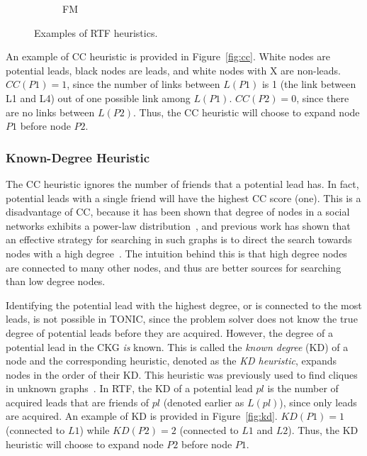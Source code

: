 \documentclass[journal]{IEEEtran}
\begin{document}
\begin{figure}
\begin{subfigure}{.19\textwidth}
   \caption{FM}\label{fig:fm_btf}
\end{subfigure}
\caption{Examples of RTF heuristics.} 
\end{figure}


An example of CC heuristic is provided in Figure~\ref{fig:cc}. White nodes are potential leads, black nodes are leads, and white nodes with X are non-leads.
$CC(P1)=1$, since the number of links between $L(P1)$ is 1 (the link between L1 and L4) out of one possible link among $L(P1)$.
$CC(P2)=0$, since there are no links between $L(P2)$. Thus, the CC  heuristic will choose to expand node $P1$ before node $P2$.

\subsubsection{Known-Degree Heuristic}
The CC heuristic ignores the number of friends that a potential lead has. In fact, potential leads with a single friend will have the highest CC score (one). This is a disadvantage of CC, because it has been shown that degree of nodes in a social networks exhibits a power-law distribution~\cite{barabasi1999emergence}, and previous work has shown that an effective strategy for searching in such graphs is to direct the search towards nodes with a high degree~\cite{adamic2001searchInPowerLaw}. 
The intuition behind this is that high degree nodes are connected to many other nodes, and thus are better sources for searching than low degree nodes.


Identifying the potential lead with the highest degree, or is connected to the most leads, is not possible in TONIC, since the problem solver does not know the true degree of potential leads before they are acquired. However, the degree of a potential lead in the CKG {\em is} known. This is called the {\em known degree} (KD) of a node and the corresponding heuristic, denoted as the {\em KD heuristic}, expands nodes in the order of their KD. This heuristic was previously used to find cliques in unknown graphs~\cite{stern2012findingPatterns}. In RTF, the KD of a potential lead $pl$ is the number of acquired leads that are friends of $pl$ (denoted earlier as $L(pl)$), since only leads are acquired. An example of KD is provided in Figure~\ref{fig:kd}.
$KD(P1)=1$ (connected to $L1$) while $KD(P2)=2$ (connected to $L1$ and $L2$). Thus, the KD  heuristic will choose to expand node $P2$ before node $P1$.
\end{document}
